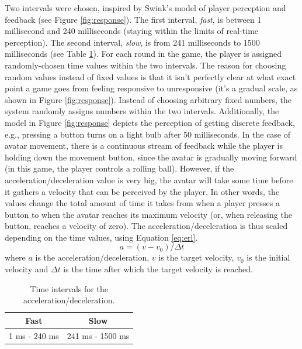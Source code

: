 Two intervals were chosen, inspired by Swink's model of player perception and feedback (see Figure \ref{fig:response}). The first interval, \textit{fast}, is between 1 millisecond and 240 milliseconds (staying within the limits of real-time perception). The second interval, \textit{slow}, is from 241 milliseconds to 1500 milliseconds (see Table \ref{tab:time}). For each round in the game, the player is assigned randomly-chosen time values within the two intervals. The reason for choosing random values instead of fixed values is that it isn't perfectly clear at what exact point a game goes from feeling responsive to unresponsive (it's a gradual scale, as shown in Figure \ref{fig:response}). Instead of choosing arbitrary fixed numbers, the system randomly assigns numbers within the two intervals. Additionally, the model in Figure \ref{fig:response} depicts the perception of getting discrete feedback, e.g., pressing a button turns on a light bulb after 50 milliseconds. In the case of avatar movement, there is a continuous stream of feedback while the player is holding down the movement button, since the avatar is gradually moving forward (in this game, the player controls a rolling ball). However, if the acceleration/deceleration value is very big, the avatar will take some time before it gathers a velocity that can be perceived by the player. In other words, the values change the total amount of time it takes from when a player presses a button to when the avatar reaches its maximum velocity (or, when releasing the button, reaches a velocity of zero). The acceleration/deceleration is thus scaled depending on the time values, using Equation \ref{eq:erl}.
\begin{equation} \label{eq:erl} %
a = (v - v_0)/{\Delta}t
\end{equation} 
where $a$ is the acceleration/deceleration, $v$ is the target velocity, $v_0$ is the initial velocity and ${\Delta}t$ is the time after which the target velocity is reached.

\begin{table} \centering
\label{tab:time}
\caption{Time intervals for the acceleration/deceleration.}
\begin{tabular}{cc}
\toprule
\textbf{Fast} & \textbf{Slow} \\
\midrule
1 ms - 240 ms & 241 ms - 1500 ms\\
\bottomrule
\end{tabular}
\end{table}

